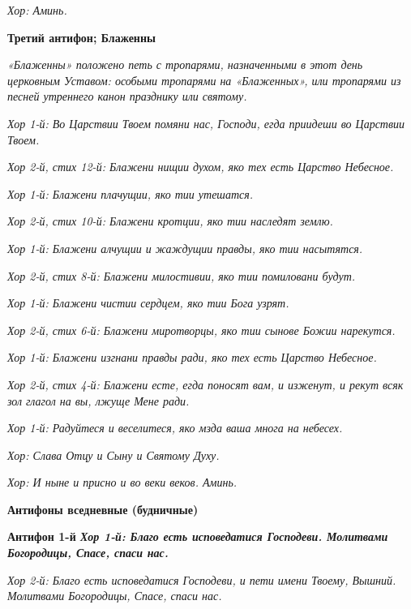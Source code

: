 \itshape Хор:\normalfont{} Аминь.





\bfseries Третий антифон; Блаженны\normalfont{}


\itshape «Блаженны» положено петь с тропарями, назначенными в этот день церковным Уставом: особыми тропарями на «Блаженных», или тропарями из песней утреннего канон празднику или святому.\normalfont{}


\itshape Хор 1-й:\normalfont{} Во Царствии Твоем помяни нас, Господи, егда приидеши во Царствии Твоем.


\itshape Хор 2-й, стих 12-й:\normalfont{} Блажени нищии духом, яко тех есть Царство Небесное.


\itshape Хор 1-й:\normalfont{} Блажени плачущии, яко тии утешатся.


\itshape Хор 2-й, стих 10-й:\normalfont{} Блажени кротции, яко тии наследят землю.


\itshape Хор 1-й:\normalfont{} Блажени алчущии и жаждущии правды, яко тии насытятся.


\itshape Хор 2-й, стих 8-й:\normalfont{} Блажени милостивии, яко тии помиловани будут.


\itshape Хор 1-й:\normalfont{} Блажени чистии сердцем, яко тии Бога узрят.


\itshape Хор 2-й, стих 6-й:\normalfont{} Блажени миротворцы, яко тии сынове Божии нарекутся.


\itshape Хор 1-й:\normalfont{} Блажени изгнани правды ради, яко тех есть Царство Небесное.


\itshape Хор 2-й, стих 4-й:\normalfont{} Блажени есте, егда поносят вам, и изженут, и рекут всяк зол глагол на вы, лжуще Мене ради.


\itshape Хор 1-й:\normalfont{} Радуйтеся и веселитеся, яко мзда ваша многа на небесех.


\itshape Хор:\normalfont{} Слава Отцу и Сыну и Святому Духу.


\itshape Хор:\normalfont{} И ныне и присно и во веки веков. Аминь.





\bfseries Антифоны вседневные (будничные)\normalfont{}


\bfseries Антифон 1-й\normalfont{} \itshape Хор 1-й:\normalfont{} Благо есть исповедатися Господеви. Молитвами Богородицы, Спасе, спаси нас.


\itshape Хор 2-й:\normalfont{} Благо есть исповедатися Господеви, и пети имени Твоему, Вышний. Молитвами Богородицы, Спасе, спаси нас.


